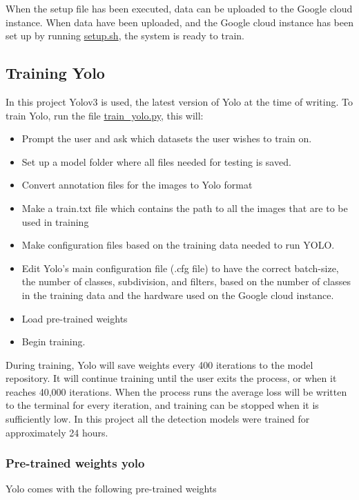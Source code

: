 When the setup file has been executed, data can be uploaded to the Google cloud instance. When data have been uploaded, and the Google cloud instance has been set up by running \url{setup.sh}, the system is ready to train.

\subsection{Training Yolo}
In this project Yolov3 is used, the latest version of Yolo at the time of writing. To train Yolo, run the file \url{train_yolo.py}, this will:

\begin{itemize}
    \item Prompt the user and ask which datasets the user wishes to train on.
    \item Set up a model folder where all files needed for testing is saved.
    \item Convert annotation files for the images to Yolo format
    \item Make a train.txt file which contains the path to all the images that are to be used in training
    \item Make configuration files based on the training data needed to run YOLO.
    \item Edit Yolo's main configuration file (.cfg file) to have the correct batch-size, the number of classes, subdivision, and filters, based on the number of classes in the training data and the hardware used on the Google cloud instance.
    \item Load pre-trained weights
    \item Begin training.
\end{itemize}

\noindent
During training, Yolo will save weights every 400 iterations to the model repository. It will continue training until the user exits the process, or when it reaches 40,000 iterations. When the process runs the average loss will be written to the terminal for every iteration, and training can be stopped when it is sufficiently low. In this project all the detection models were trained for approximately 24 hours.

\newpage

\subsubsection{Pre-trained weights yolo}
Yolo comes with the following pre-trained weights


